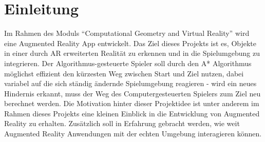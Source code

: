 \chapter{Einleitung}
Im Rahmen des Moduls “Computational Geometry and Virtual Reality” wird eine Augmented Reality App entwickelt. Das Ziel dieses Projekts ist es, Objekte in einer durch AR erweiterten Realit\"at zu erkennen und in die Spielumgebung zu integrieren. Der Algorithmus-gesteuerte Spieler soll durch den A* Algorithmus m\"oglichst effizient den k\"urzesten Weg zwischen Start und Ziel nutzen, dabei variabel auf die sich st\"andig \"andernde Spielumgebung reagieren - wird ein neues Hindernis erkannt, muss der Weg des Computergesteuerten Spielers zum Ziel neu berechnet werden. 
Die Motivation hinter dieser Projektidee ist unter anderem im Rahmen dieses Projekts eine kleinen Einblick in die Entwicklung von Augmented Reality zu erhalten. Zusätzlich soll in Erfahrung gebracht werden, wie weit Augmented Reality Anwendungen mit der echten Umgebung interagieren können.
